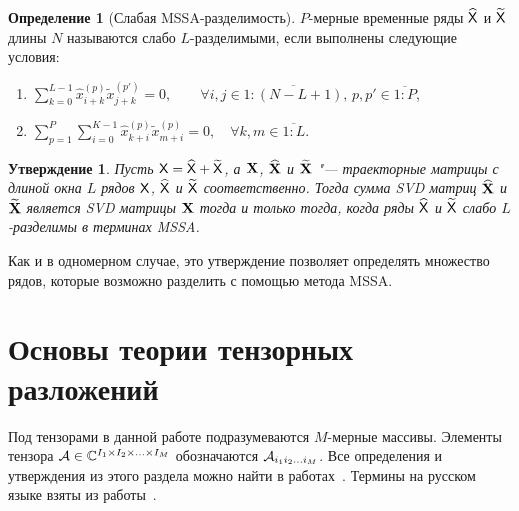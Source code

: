 \documentclass[specialist,
    substylefile=spbu.rtx,
    subf,href,colorlinks=true, 12pt]{disser}
\theoremstyle{plain}
\newtheorem{statement}{Утверждение}[section]
\theoremstyle{definition}
\newtheorem{definition}{Определение}[section]
\theoremstyle{remark}
\begin{document}
    \begin{definition}[Слабая MSSA-разделимость]
        \label{def:mssa-separability}
        $P$-мерные временные ряды $\widehat{\mathsf{X}}$ и $\widetilde{\mathsf{X}}$ длины $N$ называются слабо $L$-разделимыми, если
        выполнены следующие условия:
        \begin{enumerate}
            \item $\displaystyle \sum_{k=0}^{L-1} \hat{x}_{i+k}^{(p)}\tilde{x}_{j+k}^{(p')} = 0,
            \qquad \forall i, j \in \overline{1:(N-L+1)},\, p, p' \in \overline{1:P}$,
            \item $\displaystyle \sum_{p=1}^{P} \sum_{i=0}^{K-1} \hat{x}_{k+i}^{(p)} \tilde{x}_{m+i}^{(p)} = 0, \quad
            \forall k, m \in \overline{1:L}$.
        \end{enumerate}
    \end{definition}

    \begin{statement}
        \label{state:mssa-separability}
        Пусть $\mathsf{X} = \widehat{\mathsf{X}} + \widetilde{\mathsf{X}}$, а $\mathbf{X}$, $\widehat{\mathbf{X}}$ и $\widetilde{\mathbf{X}}$ "--- траекторные
        матрицы с длиной окна $L$ рядов $\mathsf{X}$, $\widehat{\mathsf{X}}$ и $\widetilde{\mathsf{X}}$ соответственно.
        Тогда сумма \emph{SVD} матриц $\widehat{\mathbf{X}}$ и $\widetilde{\mathbf{X}}$ является \emph{SVD} матрицы $\mathbf{X}$ тогда и только тогда, когда
        ряды $\widehat{\mathsf{X}}$ и $\widetilde{\mathsf{X}}$ слабо $L$-разделимы в терминах MSSA.
    \end{statement}
    Как и в одномерном случае, это утверждение позволяет определять множество рядов, которые возможно разделить с
    помощью метода MSSA.


    \section{Основы теории тензорных разложений}\label{sec:tensor-decompositions}
    Под тензорами в данной работе подразумеваются $M$-мерные массивы.
    Элементы тензора $\mathcal{A} \in \mathbb{C}^{I_1 \times I_2 \times \ldots \times I_M}$ обозначаются
    $\mathcal{A}_{i_1 i_2 \ldots i_M}$.
    Все определения и утверждения из этого раздела можно найти в 
    работах~\cite{hosvd, tensor-bg, tensor-bg2, tensor-bg3}.
    Термины на русском языке взяты из работы~\cite{tensor-rus}.
\end{document}
